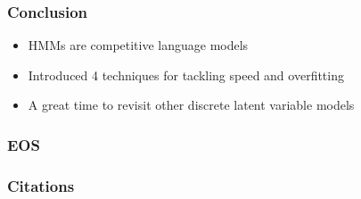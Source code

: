 \documentclass{beamer}
\begin{document}
\begin{frame}
\frametitle{Conclusion}
\begin{itemize}
\item HMMs are competitive language models
\vspace{2em}
\item Introduced 4 techniques for tackling speed and overfitting
\vspace{2em}
\item A great time to revisit other discrete latent variable models
\end{itemize}
\end{frame}

\begin{frame}
\frametitle{EOS}
\end{frame}


\begin{frame}
\frametitle{Citations}


\end{frame}
\end{document}
